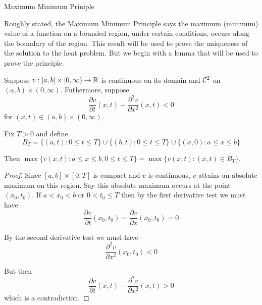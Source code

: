 \begin{section}{Maximum Minimum Priniple}

Roughly stated, the Maximum Minimum Principle
says the maximum (minimum) value of a function
on a bounded region, under certain conditions,
occurs along the boundary of the region. This
result will be used to prove the uniqueness of
the solution to the heat problem. But we begin
with a lemma that will be used to prove the
principle.


\begin{lemma}\label{lemma:maxmin}
	Suppose $v:[a,b] \times [0,\infty) \to \real$ 
	is continuous on its domain and $\ctsdiff[2]$
	on $(a,b) \times (0,\infty)$. Futhermore, suppose
		\begin{displaymath}
			\frac{\partial v}{\partial t}(x,t)
				- \frac{\partial^2 v}{\partial x^2}(x,t)
				< 0
		\end{displaymath}
	for $(x,t) \in (a,b) \times (0,\infty)$.
	
	Fix $T > 0$ and define
		\begin{displaymath}
			B_T = \{(a,t):0 \leq t \leq T\}
				\cup \{(b,t):0 \leq t \leq T\}
				\cup \{(x,0):a \leq x \leq b\}
		\end{displaymath}
		
	Then $\max \{v(x,t):a \leq x \leq b, 0 \leq t \leq T\}
	= \max \{v(x,t):(x,t) \in B_T\}$.
\end{lemma}

\begin{proof}
	Since $[a,b] \times [0,T]$ is compact and $v$ is
	continuous, $v$ attains an absolute maximum on this
	region. Say this absolute maximum occurs at the point
	$(x_0,t_0)$. If $a < x_0 < b$ or $0 < t_0 \leq T$ then
	by the first derivative test we must have
		\begin{displaymath}
			\frac{\partial v}{\partial t}(x_0,t_0)
				= \frac{\partial v}{\partial x}(x_0,t_0)
				= 0
		\end{displaymath}
				
	By the second derivative test we must have
		\begin{displaymath}
			\frac{\partial^2 v}{\partial x^2}(x_0,t_0) < 0
		\end{displaymath}
	
	But then
		\begin{displaymath}
			\frac{\partial v}{\partial t}(x,t)
				- \frac{\partial^2 v}{\partial x^2}(x,t)
				> 0
		\end{displaymath}
	which is a contradiction.
\end{proof}


\end{section}
